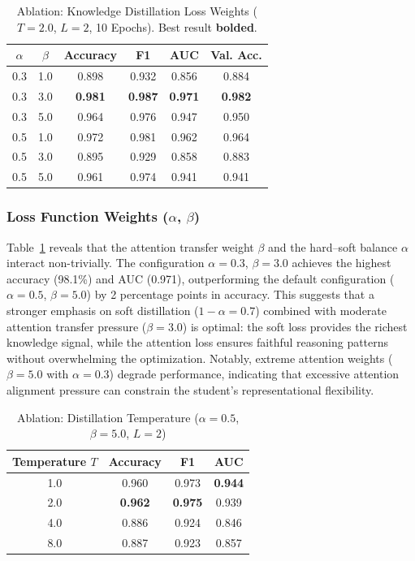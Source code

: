 \documentclass[lettersize,journal]{IEEEtran}
\begin{document}
\begin{table}[!t]
\caption{Ablation: Knowledge Distillation Loss Weights ($T{=}2.0$, $L{=}2$, 10 Epochs). Best result \textbf{bolded}.\label{tab:ablation_loss}}
\centering
\footnotesize
\begin{tabular}{cccccc}
\toprule
$\alpha$ & $\beta$ & \textbf{Accuracy} & \textbf{F1} & \textbf{AUC} & \textbf{Val. Acc.} \\
\midrule
0.3 & 1.0 & 0.898 & 0.932 & 0.856 & 0.884 \\
0.3 & 3.0 & \textbf{0.981} & \textbf{0.987} & \textbf{0.971} & \textbf{0.982} \\
0.3 & 5.0 & 0.964 & 0.976 & 0.947 & 0.950 \\
0.5 & 1.0 & 0.972 & 0.981 & 0.962 & 0.964 \\
0.5 & 3.0 & 0.895 & 0.929 & 0.858 & 0.883 \\
0.5 & 5.0 & 0.961 & 0.974 & 0.941 & 0.941 \\
\bottomrule
\end{tabular}
\end{table}

\subsubsection{Loss Function Weights ($\alpha$, $\beta$)}
Table~\ref{tab:ablation_loss} reveals that the attention transfer weight $\beta$ and the hard--soft balance $\alpha$ interact non-trivially. The configuration $\alpha = 0.3$, $\beta = 3.0$ achieves the highest accuracy (98.1\%) and AUC (0.971), outperforming the default configuration ($\alpha = 0.5$, $\beta = 5.0$) by 2 percentage points in accuracy. This suggests that a stronger emphasis on soft distillation ($1 - \alpha = 0.7$) combined with moderate attention transfer pressure ($\beta = 3.0$) is optimal: the soft loss provides the richest knowledge signal, while the attention loss ensures faithful reasoning patterns without overwhelming the optimization. Notably, extreme attention weights ($\beta = 5.0$ with $\alpha = 0.3$) degrade performance, indicating that excessive attention alignment pressure can constrain the student's representational flexibility.

\begin{table}[!t]
\caption{Ablation: Distillation Temperature ($\alpha{=}0.5$, $\beta{=}5.0$, $L{=}2$)\label{tab:ablation_temp}}
\centering
\footnotesize
\begin{tabular}{cccc}
\toprule
\textbf{Temperature $T$} & \textbf{Accuracy} & \textbf{F1} & \textbf{AUC} \\
\midrule
1.0 & 0.960 & 0.973 & \textbf{0.944} \\
2.0 & \textbf{0.962} & \textbf{0.975} & 0.939 \\
4.0 & 0.886 & 0.924 & 0.846 \\
8.0 & 0.887 & 0.923 & 0.857 \\
\bottomrule
\end{tabular}
\end{table}
\end{document}
